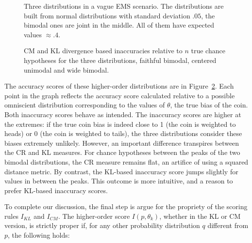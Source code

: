 \documentclass[
  letterpaper,
  DIV=11,
  numbers=noendperiod]{scrartcl}
\begin{document}
\begin{figure}[H]


\caption{\label{fig-emc}Three distributions in a vague EMS scenario. The
distributions are built from normal distributions with standard
deviation \(.05\), the bimodal ones are joint in the middle. All of them
have expected values \(\approx .4\).}

\end{figure}%

\begin{figure}[H]


\caption{\label{fig-inaccuracies2}CM and KL divergence based
inaccuracies relative to \(n\) true chance hypotheses for the three
distributions, faithful bimodal, centered unimodal and wide bimodal.}

\end{figure}%

The accuracy scores of these higher-order distributions are in
Figure~\ref{fig-inaccuracies2}. Each point in the graph reflects the
accuracy score calculated relative to a possible omniscient distribution
corresponding to the values of \(\theta\), the true bias of the coin.
Both inaccuracy scores behave as intended. The inaccuracy scores are
higher at the extremes: if the true coin bias is indeed close to 1 (the
coin is weighted to heads) or 0 (the coin is weighted to tails), the
three distributions consider these biases extremely unlikely. However,
an important difference transpires between the CR and KL measures. For
chance hypotheses between the peaks of the two bimodal distributions,
the CR measure remains flat, an artifice of using a squared distance
metric. By contrast, the KL-based inaccuracy score jumps slightly for
values in between the peaks. This outcome is more intuitive, and a
reason to prefer KL-based inaccuracy scores.

To complete our discussion, the final step is argue for the propriety of
the scoring rules \(I_{KL}\) and \(I_{CM}\). The higher-order score
\(I(p, \theta_k)\), whether in the KL or CM version, is strictly proper
if, for any other probability distribution \(q\) different from \(p\),
the following holds:
\end{document}
